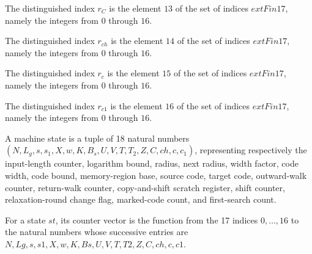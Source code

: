 \begin{definition}
\label{Complexity.LogProg.ExpBFS.rC}
\leanok
The distinguished index $r_C$ is the element $13$ of the set of indices $	ext{Fin }17$,
namely the integers from $0$ through $16$.
\end{definition}

\begin{definition}
\label{Complexity.LogProg.ExpBFS.rch}
\leanok
The distinguished index $r_{ch}$ is the element $14$ of the set of indices $	ext{Fin
}17$, namely the integers from $0$ through $16$.
\end{definition}

\begin{definition}
\label{Complexity.LogProg.ExpBFS.rc}
\leanok
The distinguished index $r_c$ is the element $15$ of the set of indices $	ext{Fin }17$,
namely the integers from $0$ through $16$.
\end{definition}

\begin{definition}
\label{Complexity.LogProg.ExpBFS.rc1}
\leanok
The distinguished index $r_{c1}$ is the element $16$ of the set of indices $	ext{Fin
}17$, namely the integers from $0$ through $16$.
\end{definition}

\begin{definition}
\label{Complexity.LogProg.ExpBFS.St}
\leanok
A machine state is a tuple of 18 natural numbers
$(N,L_g,s,s_1,X,w,K,B_s,U,V,T,T_2,Z,C,ch,c,c_1)$, representing respectively the
input-length counter, logarithm bound, radius, next radius, width factor, code width,
code bound, memory-region base, source code, target code, outward-walk counter,
return-walk counter, copy-and-shift scratch register, shift counter, relaxation-round
change flag, marked-code count, and first-search count.
\end{definition}

\begin{definition}
\label{Complexity.LogProg.ExpBFS.St.toV}
\leanok
{}
For a state $st$, its counter vector is the function from the 17 indices $0,\ldots,16$
to the natural numbers whose successive entries are
$N,Lg,s,s1,X,w,K,Bs,U,V,T,T2,Z,C,ch,c,c1$.
\end{definition}

